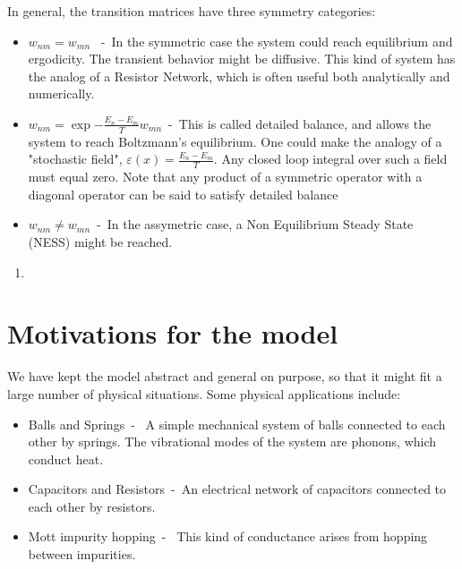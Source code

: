In general, the transition matrices have three symmetry categories:
\begin{itemize}
  \item 
    $w_{nm} = w_{mn}$ \ -\ In the symmetric case the system could reach
      equilibrium and ergodicity. The transient behavior might be diffusive. 
      This kind of system has the analog of a Resistor Network, which is often
      useful both analytically and numerically.
  \item
    $w_{nm} = \exp{-\frac{E_n-E_m}{T}} w_{mn}$\ -\ This is called detailed balance,
      and allows the system to reach Boltzmann's equilibrium. One could make
      the analogy of a "stochastic field", $\varepsilon(x) = \frac{E_n-E_m}{T}$.
      Any closed loop integral over such a field must equal zero.
      Note that any product of a symmetric operator with a diagonal operator
      can be said to satisfy detailed balance \cite{kolmogoroff_zur_1936}
  \item
    $w_{nm} \ne w_{mn}$\ -\ In the assymetric case, a Non Equilibrium Steady
      State (NESS) might be reached. 
\end{itemize}

\begin{enumerate}
  \item
\end{enumerate}


\section{Motivations for the model}

We have kept the model abstract and general on purpose, so that it
might fit a large number of physical situations. Some physical applications include:
%
\begin{itemize}
  \item
    Balls and Springs\ - \ A simple mechanical system of balls connected to each
      other by springs. The vibrational modes of the system are phonons, which conduct heat.
  \item
    Capacitors and Resistors\ -\ An electrical network of capacitors connected to each other
      by resistors.
  \item 
    Mott impurity hopping\ - \ This kind of conductance arises from hopping 
      between impurities.
\end{itemize}


